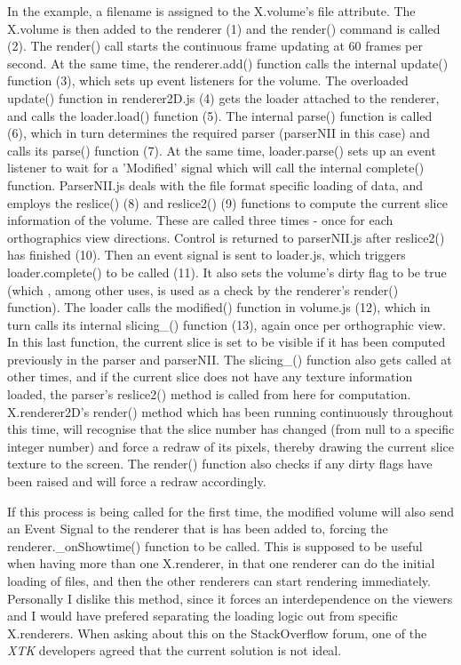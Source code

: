 \documentclass[a4paper,11pt,twoside]{article}
\begin{document}
In the example, a filename is assigned to the X.volume's file attribute. The X.volume is then added to the renderer (1) and the render() command is called (2). The render() call starts the continuous frame updating at 60 frames per second. At the same time, the renderer.add() function calls the internal update() function (3), which sets up event listeners for the volume. The overloaded update() function in renderer2D.js (4) gets the loader attached to the renderer, and calls the loader.load() function (5). The internal parse() function is called (6), which in turn determines the required parser (parserNII in this case) and calls its parse() function (7). At the same time, loader.parse() sets up an event listener to wait for a 'Modified' signal which will call the internal complete() function. ParserNII.js deals with the file format specific loading of data, and employs the reslice() (8) and reslice2() (9) functions to compute the current slice information of the volume. These are called three times - once for each orthographics view directions. Control is returned to parserNII.js after reslice2() has finished (10). Then an event signal is sent to loader.js, which triggers loader.complete() to be called (11). It also sets the volume's dirty flag to be true (which , among other uses, is used as a check by the renderer's render() function). The loader calls the modified() function in volume.js (12), which in turn calls its internal slicing\_() function (13), again once per orthographic view. In this last function, the current slice is set to be visible if it has been computed previously in the parser and parserNII. The slicing\_() function also gets called at other times, and if the current slice does not have any texture information loaded, the parser's reslice2() method is called from here for computation. X.renderer2D's render() method which has been running continuously throughout this time, will recognise that the slice number has changed (from null to a specific integer number) and force a redraw of its pixels, thereby drawing the current slice texture to the screen. The render() function also checks if any dirty flags have been raised and will force a redraw accordingly.

If this process is being called for the first time, the modified volume will also send an Event Signal to the renderer that is has been added to, forcing the renderer.\_onShowtime() function to be called. This is supposed to be useful when having more than one X.renderer, in that one renderer can do the initial loading of files, and then the other renderers can start rendering immediately. Personally I dislike this method, since it forces an interdependence on the viewers and I would have prefered separating the loading logic out from specific X.renderers. When asking about this on the StackOverflow forum, one of the \textit{XTK} developers agreed that the current solution is not ideal.
\end{document}
